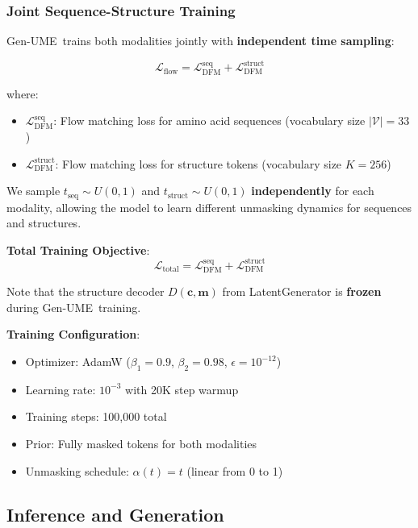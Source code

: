 \documentclass[11pt,a4paper]{article}
\newcommand{\genume}{Gen-UME}
\newcommand{\vocab}{\mathcal{V}}
\begin{document}
\subsubsection{Joint Sequence-Structure Training}

\genume~trains both modalities jointly with \textbf{independent time sampling}:

\begin{equation}
\mathcal{L}_{\text{flow}} = \mathcal{L}_{\text{DFM}}^{\text{seq}} + \mathcal{L}_{\text{DFM}}^{\text{struct}}
\end{equation}

where:
\begin{itemize}
\item $\mathcal{L}_{\text{DFM}}^{\text{seq}}$: Flow matching loss for amino acid sequences (vocabulary size $|\vocab| = 33$)
\item $\mathcal{L}_{\text{DFM}}^{\text{struct}}$: Flow matching loss for structure tokens (vocabulary size $K = 256$)
\end{itemize}

We sample $t_{\text{seq}} \sim U(0,1)$ and $t_{\text{struct}} \sim U(0,1)$ \textbf{independently} for each modality, allowing the model to learn different unmasking dynamics for sequences and structures.

\textbf{Total Training Objective}:
\begin{equation}
\mathcal{L}_{\text{total}} = \mathcal{L}_{\text{DFM}}^{\text{seq}} + \mathcal{L}_{\text{DFM}}^{\text{struct}}
\end{equation}

Note that the structure decoder $D(\mathbf{c}, \mathbf{m})$ from LatentGenerator is \textbf{frozen} during \genume~training.

\textbf{Training Configuration}:
\begin{itemize}
\item Optimizer: AdamW ($\beta_1=0.9$, $\beta_2=0.98$, $\epsilon=10^{-12}$)
\item Learning rate: $10^{-3}$ with 20K step warmup
\item Training steps: 100,000 total
\item Prior: Fully masked tokens for both modalities
\item Unmasking schedule: $\alpha(t) = t$ (linear from 0 to 1)
\end{itemize}

\subsection{Inference and Generation}
\end{document}

